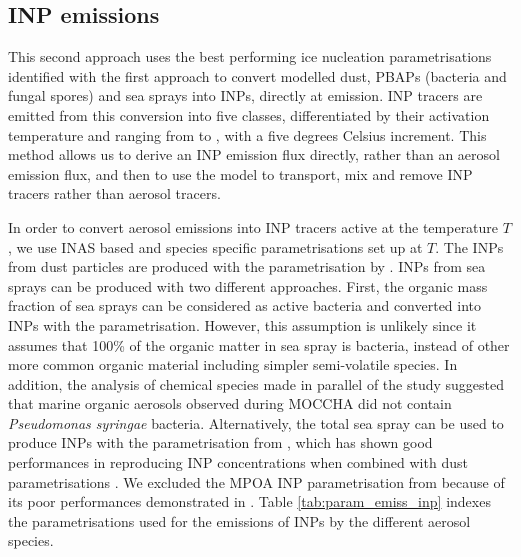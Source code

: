     \subsection{INP emissions}
    \label{sec:method_inp_emission}
    This second approach uses the best performing ice nucleation parametrisations identified with the first approach to convert modelled dust, PBAPs (bacteria and fungal spores) and sea sprays into INPs, directly at emission.
    INP tracers are emitted from this conversion into five classes, differentiated by their activation temperature and ranging from  to , with a five degrees Celsius increment.
    This method allows us to derive an INP emission flux directly, rather than an aerosol emission flux, and then to use the model to transport, mix and remove INP tracers rather than aerosol tracers.
    
    In order to convert aerosol emissions into INP tracers active at the temperature $T$, we use INAS based and species specific parametrisations set up at $T$.
    The INPs from dust particles are produced with the parametrisation by \citet{niemand_particle-surface-area-based_2012}.
    INPs from sea sprays can be produced with two different approaches. First, the organic mass fraction of sea sprays can be considered as active bacteria and converted into INPs with the \citet{hummel_simulating_2018} parametrisation. However, this assumption is unlikely since it assumes that 100\% of the organic matter in sea spray is bacteria, instead of other more common organic material including simpler semi-volatile species. In addition, the analysis of chemical species made in parallel of the \citet{kojoj_arctic_2024} study suggested that marine organic aerosols observed during MOCCHA did not contain \textit{Pseudomonas syringae} bacteria.
    Alternatively, the total sea spray can be used to produce INPs with the parametrisation from \citet{mccluskey_marine_2018}, which has shown good performances in reproducing INP concentrations when combined with dust parametrisations \citep[][]{mccluskey_numerical_2019}.
    We excluded the MPOA INP parametrisation from \citet{wilson_marine_2015} because of its poor performances demonstrated in \citet{mccluskey_numerical_2019}. %
    Table \ref{tab:param_emiss_inp} indexes the parametrisations used for the emissions of INPs by the different aerosol species.
    
